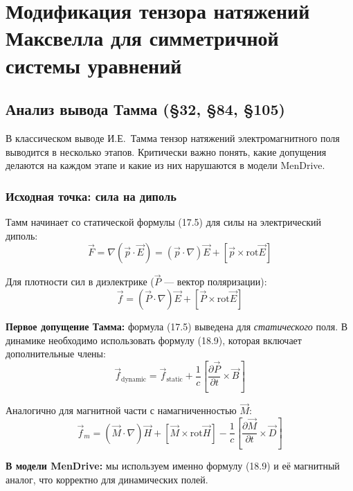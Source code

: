 \documentclass[a4paper,12pt]{article}
\begin{document}
\section{Модификация тензора натяжений Максвелла для симметричной системы уравнений}

\subsection{Анализ вывода Тамма (\S 32, \S 84, \S 105)}

В классическом выводе И.Е.~Тамма \cite{Tamm} тензор натяжений электромагнитного поля выводится в несколько этапов. Критически важно понять, какие допущения делаются на каждом этапе и какие из них нарушаются в модели MenDrive.

\subsubsection{Исходная точка: сила на диполь}

Тамм начинает со статической формулы (17.5) для силы на электрический диполь:
\begin{equation}
\vec{F} = \nabla(\vec{p}\cdot\vec{E}) = (\vec{p}\cdot\nabla)\vec{E} + [\vec{p}\times\text{rot}\vec{E}]
\label{eq:tamm_17.5}
\end{equation}

Для плотности сил в диэлектрике ($\vec{P}$ --- вектор поляризации):
\begin{equation}
\vec{f} = (\vec{P}\cdot\nabla)\vec{E} + [\vec{P}\times\text{rot}\vec{E}]
\label{eq:tamm_32.10}
\end{equation}

\textbf{Первое допущение Тамма:} формула (17.5) выведена для \textit{статического} поля. В динамике необходимо использовать формулу (18.9), которая включает дополнительные члены:
\begin{equation}
\vec{f}_{\text{dynamic}} = \vec{f}_{\text{static}} + \frac{1}{c}\left[\frac{\partial\vec{P}}{\partial t}\times\vec{B}\right]
\label{eq:tamm_18.9}
\end{equation}

Аналогично для магнитной части с намагниченностью $\vec{M}$:
\begin{equation}
\vec{f}_m = (\vec{M}\cdot\nabla)\vec{H} + [\vec{M}\times\text{rot}\vec{H}] - \frac{1}{c}\left[\frac{\partial\vec{M}}{\partial t}\times\vec{D}\right]
\label{eq:magnetic_dynamic}
\end{equation}

\textbf{В модели MenDrive:} мы используем именно формулу (18.9) и её магнитный аналог, что корректно для динамических полей.
\end{document}
